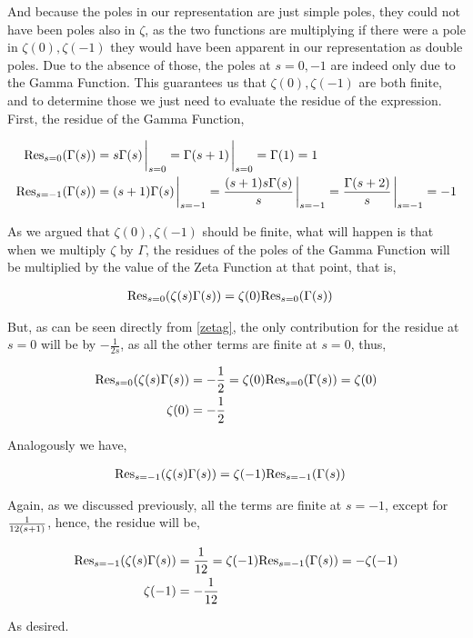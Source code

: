 And because the poles in our representation are just simple poles, they could not have been poles also in $\zeta$, as the two functions are multiplying 
if there were a pole in $\zeta(0),\zeta(-1)$ they would have been apparent in our representation as double poles. Due to the absence of those, the poles at $s=0,-1$ are indeed only due to the Gamma Function. 
This guarantees us that $\zeta(0),\zeta(-1)$ are both finite, and to determine those we just need to evaluate the residue of the expression. First, the residue of the Gamma Function,

\begin{align*}
    \textnormal{Res}_{s=0}\qty(\Gamma\qty(s))&=s\Gamma\qty(s)\eval_{s=0}=\Gamma\qty(s+1)\eval_{s=0}=\Gamma\qty(1)=1\\
    \textnormal{Res}_{s=-1}\qty(\Gamma\qty(s))&=\qty(s+1)\Gamma\qty(s)\eval_{s=-1}=\frac{\qty(s+1)s\Gamma\qty(s)}{s}\eval_{s=-1}=\frac{\Gamma\qty(s+2)}{s}\eval_{s=-1}=-1
\end{align*}

As we argued that $\zeta(0),\zeta(-1)$ should be finite, what will happen is that when we multiply $\zeta$ by $\Gamma$, the residues of the poles of the Gamma Function will be 
multiplied by the value of the Zeta Function at that point, that is,

\begin{align*}
    \textnormal{Res}_{s=0}\qty(\zeta\qty(s)\Gamma\qty(s))&=\zeta\qty(0)\textnormal{Res}_{s=0}\qty(\Gamma\qty(s))
\end{align*}

But, as can be seen directly from \ref{zetag}, the only contribution for the residue at $s=0$ will be by $-\frac{1}{2s}$, as all the other terms are finite at $s=0$, 
thus,

\begin{align*}
    \textnormal{Res}_{s=0}\qty(\zeta\qty(s)\Gamma\qty(s))&=-\frac12=\zeta\qty(0)\textnormal{Res}_{s=0}\qty(\Gamma\qty(s))=\zeta(0)\\
    \zeta\qty(0)&=-\frac12
\end{align*}

Analogously we have,

\begin{align*}
    \textnormal{Res}_{s=-1}\qty(\zeta\qty(s)\Gamma\qty(s))&=\zeta\qty(-1)\textnormal{Res}_{s=-1}\qty(\Gamma\qty(s))
\end{align*}

Again, as we discussed previously, all the terms are finite at $s=-1$, except for $\frac{1}{12\qty(s+1)}$, hence, the residue will be,

\begin{align*}
    \textnormal{Res}_{s=-1}\qty(\zeta\qty(s)\Gamma\qty(s))&=\frac{1}{12}=\zeta\qty(-1)\textnormal{Res}_{s=-1}\qty(\Gamma\qty(s))=-\zeta\qty(-1)\\
    \zeta(-1)&=-\frac{1}{12}
\end{align*}

As desired.